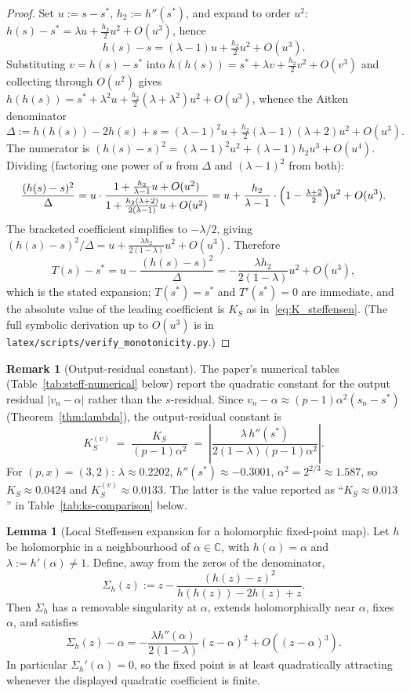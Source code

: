 \documentclass[11pt,a4paper]{article}
\theoremstyle{definition}
\newtheorem{lemma}[theorem]{Lemma}
\newtheorem{remark}{Remark}[section]
\begin{document}
\begin{proof}
Set $u := s - s^*$, $h_2 := h''(s^*)$, and expand to order $u^2$:
$h(s) - s^* = \lambda u + \tfrac{h_2}{2}u^2 + O(u^3)$, hence
\[
  h(s) - s = (\lambda - 1)u + \tfrac{h_2}{2}u^2 + O(u^3).
\]
Substituting $v = h(s) - s^*$ into $h(h(s)) = s^* + \lambda v + \tfrac{h_2}{2}v^2 + O(v^3)$ and collecting through $O(u^2)$ gives $h(h(s)) = s^* + \lambda^2 u + \tfrac{h_2}{2}(\lambda + \lambda^2)u^2 + O(u^3)$, whence the Aitken denominator
\[
  \Delta := h(h(s)) - 2h(s) + s = (\lambda - 1)^2 u + \tfrac{h_2}{2}(\lambda - 1)(\lambda + 2)u^2 + O(u^3).
\]
The numerator is $(h(s) - s)^2 = (\lambda - 1)^2 u^2 + (\lambda - 1)h_2 u^3 + O(u^4)$. Dividing (factoring one power of $u$ from $\Delta$ and $(\lambda-1)^2$ from both):
\[
  \frac{(h(s) - s)^2}{\Delta}
   = u \cdot \frac{1 + \tfrac{h_2}{\lambda-1}u + O(u^2)}{1 + \tfrac{h_2(\lambda+2)}{2(\lambda-1)}u + O(u^2)}
   = u + \frac{h_2}{\lambda - 1}\cdot\Bigl(1 - \tfrac{\lambda+2}{2}\Bigr)u^2 + O(u^3).
\]
The bracketed coefficient simplifies to $-\lambda/2$, giving $(h(s)-s)^2/\Delta = u + \tfrac{\lambda h_2}{2(1-\lambda)}u^2 + O(u^3)$. Therefore
\[
  T(s) - s^* = u - \frac{(h(s)-s)^2}{\Delta} = -\frac{\lambda h_2}{2(1-\lambda)}u^2 + O(u^3),
\]
which is the stated expansion; $T(s^*) = s^*$ and $T'(s^*) = 0$ are immediate, and the absolute value of the leading coefficient is $K_S$ as in~\eqref{eq:K_steffensen}. (The full symbolic derivation up to $O(u^3)$ is in \texttt{latex/scripts/verify\_monotonicity.py}.)
\end{proof}

\begin{remark}[Output-residual constant]\label{rem:K-output}
The paper's numerical tables (Table~\ref{tab:steff-numerical} below) report the quadratic constant for the output residual $|v_n - \alpha|$ rather than the $s$-residual. Since $v_n - \alpha \approx (p-1)\alpha^2(s_n - s^*)$ (Theorem~\ref{thm:lambda}), the output-residual constant is
\[
  K_S^{(v)} \;=\; \frac{K_S}{(p-1)\alpha^2}
          \;=\; \left|\frac{\lambda\, h''(s^*)}{2(1 - \lambda)(p-1)\alpha^2}\right|.
\]
For $(p, x) = (3, 2)$: $\lambda \approx 0.2202$, $h''(s^*) \approx -0.3001$, $\alpha^2 = 2^{2/3} \approx 1.587$, so $K_S \approx 0.0424$ and $K_S^{(v)} \approx 0.0133$. The latter is the value reported as ``$K_S \approx 0.013$'' in Table~\ref{tab:ks-comparison} below.
\end{remark}

\begin{lemma}[Local Steffensen expansion for a holomorphic fixed-point map]\label{lem:steffensen-local-general}
Let $h$ be holomorphic in a neighbourhood of $\alpha \in \mathbb{C}$, with
$h(\alpha)=\alpha$ and $\lambda := h'(\alpha) \ne 1$. Define, away from the
zeros of the denominator,
\[
  \Sigma_h(z) :=
  z - \frac{(h(z)-z)^2}{h(h(z))-2h(z)+z}.
\]
Then $\Sigma_h$ has a removable singularity at $\alpha$, extends holomorphically
near $\alpha$, fixes $\alpha$, and satisfies
\[
  \Sigma_h(z)-\alpha
  =
  -\frac{\lambda h''(\alpha)}{2(1-\lambda)}(z-\alpha)^2
  + O\!\left((z-\alpha)^3\right).
\]
In particular $\Sigma_h'(\alpha)=0$, so the fixed point is at least
quadratically attracting whenever the displayed quadratic coefficient is
finite.
\end{lemma}
\end{document}
